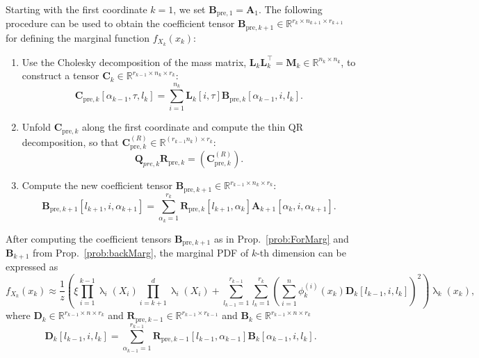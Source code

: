 \begin{prop}
	\label{prob:ForMarg}
	Starting with the first coordinate $k = 1$, we set $\bm{B}_{\text{pre},1} = \bm{A}_1$. The following procedure can be used to obtain the coefficient tensor $\bm{B}_{\text{pre},k+1} \in \mathbb{R}^{r_{k} \times n_{k+1} \times r_{k+1}}$ for defining the marginal function $f_{X_k}(x_k)$:
	\begin{enumerate}
		\item Use the Cholesky decomposition of the mass matrix, $\bm{L}_k \bm{L}_k^\top = \bm{M}_k \in \mathbb{R}^{n_k \times n_k}$, to construct a tensor $\bm{C}_k \in \mathbb{R}^{r_{k-1} \times n_k \times r_k}$:
		\begin{equation}
			\bm{C}_{\text{pre},k}[\alpha_{k-1}, \tau, l_k] = \sum_{i=1}^{n_k} \bm{L}_k[i, \tau] \bm{B}_{\text{pre},k}[\alpha_{k-1}, i, l_k] .
		\end{equation}
		\item Unfold $\bm{C}_{\text{pre},k}$ along the first coordinate and compute the thin QR decomposition, so that $\bm{C}_{\text{pre},k}^{(R)} \in \mathbb{R}^{(r_{k-1} n_k ) \times r_k}$:
		\begin{equation}
			\bm{Q}_{pre,k}\bm{R}_{\text{pre},k} = {(\bm{C}_{\text{pre},k}^{(R)})}.
		\end{equation}
		\item Compute the new coefficient tensor $\bm{B}_{\text{pre}, k+1} \in \mathbb{R}^{r_{k-1} \times n_k \times r_k} $:
		\begin{equation}
			\bm{B}_{\text{pre}, k+1}[l_{k+1}, i, \alpha_{k+1}] = \sum_{\alpha_{k}=1}^{r_{k}} \bm{R}_{\text{pre},k}[l_{k+1}, \alpha_{k}] \bm{A}_{k+1}[\alpha_{k}, i, \alpha_{k+1}] .
		\end{equation}
	\end{enumerate}
\end{prop}
After computing the coefficient tensors $\bm{B}_{\text{pre}, k+1}$ as in Prop.~\ref{prob:ForMarg} and $\bm{B}_{k+1}$ from Prop.~\ref{prob:backMarg}, the marginal PDF of $k$-th dimension can be expressed as
\begin{equation}
	f_{X_k}(x_k)  \approx \frac{1}{z} \left(\xi \prod_{i=1}^{k-1} \uplambda_i(X_i) \prod_{i=k+1}^{d} \uplambda_i(X_i) + \sum_{l_{k-1}=1}^{r_{k-1}} \sum_{l_k=1}^{r_k} \left(\sum_{i=1}^{n} \phi^{(i)}_k(x_k) \bm{D}_k[l_{k-1},i, l_k] \right)^2 \right) \uplambda_k(x_k),
\end{equation}
where $\bm{D}_k \in \mathbb{R}^{r_{k-1} \times n \times r_k}$ and $\bm{R}_{\text{pre},k-1}\in \mathbb{R}^{r_{k-1} \times r_{k-1}}$ and $\bm{B}_k \in \mathbb{R}^{r_{k-1} \times n \times r_k}$
\begin{equation}
	\bm{D}_k[l_{k-1},i,l_k] = \sum_{\alpha_{k-1}=1}^{r_{k-1}}  \bm{R}_{\text{pre},k-1}[l_{k-1}, \alpha_{k-1}] \bm{B}_k[\alpha_{k-1}, i, l_k].
\end{equation}

